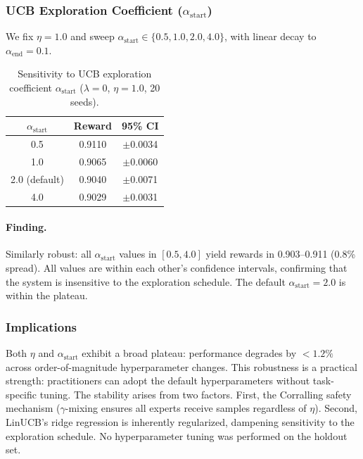 \subsubsection{UCB Exploration Coefficient ($\alpha_{\text{start}}$)}

We fix $\eta{=}1.0$ and sweep
$\alpha_{\text{start}} \in \{0.5, 1.0, 2.0, 4.0\}$, with linear decay to
$\alpha_{\text{end}}{=}0.1$.

\begin{table}[h]
\centering
\caption{Sensitivity to UCB exploration coefficient $\alpha_{\text{start}}$
($\lambda{=}0$, $\eta{=}1.0$, 20 seeds).}
\label{tab:alpha_sensitivity}
\small
\begin{tabular}{@{}ccc@{}}
\toprule
$\alpha_{\text{start}}$ & \textbf{Reward} & \textbf{95\% CI} \\
\midrule
0.5  & 0.9110 & $\pm$0.0034 \\
1.0  & 0.9065 & $\pm$0.0060 \\
2.0 (default)  & 0.9040 & $\pm$0.0071 \\
4.0  & 0.9029 & $\pm$0.0031 \\
\bottomrule
\end{tabular}
\end{table}

\paragraph{Finding.}
Similarly robust: all $\alpha_{\text{start}}$ values in $[0.5, 4.0]$ yield
rewards in 0.903--0.911 (0.8\% spread).  All values are within each
other's confidence intervals, confirming that the system is insensitive
to the exploration schedule.  The default $\alpha_{\text{start}}{=}2.0$
is within the plateau.

\subsubsection{Implications}

Both $\eta$ and $\alpha_{\text{start}}$ exhibit a broad plateau:
performance degrades by $<1.2\%$ across order-of-magnitude hyperparameter
changes.  This robustness is a practical strength: practitioners can adopt
the default hyperparameters without task-specific tuning.  The stability
arises from two factors.  First, the Corralling safety mechanism
($\gamma$-mixing ensures all experts receive samples regardless of $\eta$).
Second, LinUCB's ridge regression is inherently regularized, dampening
sensitivity to the exploration schedule.  No hyperparameter tuning was
performed on the holdout set.

